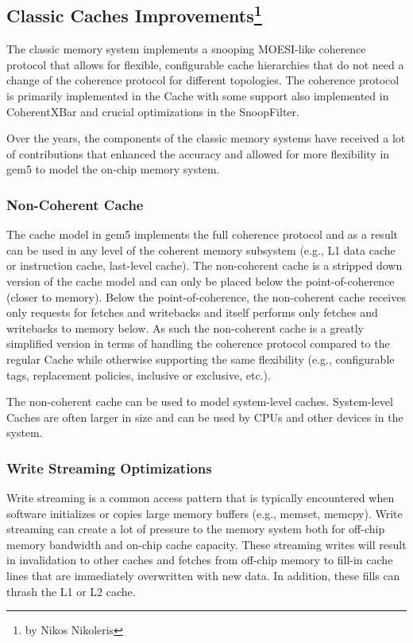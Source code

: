 \subsection[Classic Caches Improvements]{Classic Caches Improvements\footnote{by Nikos Nikoleris}}

The classic memory system implements a snooping MOESI-like coherence protocol that allows for flexible, configurable cache hierarchies that do not need a change of the coherence protocol for different topologies.
The coherence protocol is primarily implemented in the Cache with some support also implemented in CoherentXBar and crucial optimizations in the SnoopFilter.

Over the years, the components of the classic memory systems have received a lot of contributions that enhanced the accuracy and allowed for more flexibility in gem5 to model the on-chip memory system.

\subsubsection[Non-Coherent Cache]{Non-Coherent Cache}
The cache model in gem5 implements the full coherence protocol and as a result can be used in any level of the coherent memory subsystem (e.g., L1 data cache or instruction cache, last-level cache).
The non-coherent cache is a stripped down version of the cache model and can only be placed below the point-of-coherence (closer to memory).
Below the point-of-coherence, the non-coherent cache receives only requests for fetches and writebacks and itself performs only fetches and writebacks to memory below.
As such the non-coherent cache is a greatly simplified version in terms of handling the coherence protocol compared to the regular Cache while otherwise supporting the same flexibility (e.g., configurable tags, replacement policies, inclusive or exclusive, etc.).

The non-coherent cache can be used to model system-level caches.
System-level Caches are often larger in size and can be used by CPUs and other devices in the system.

\subsubsection[Write Streaming Optimizations]{Write Streaming Optimizations}

Write streaming is a common access pattern that is typically encountered when software initializes or copies large memory buffers (e.g., memset, memcpy).
Write streaming can create a lot of pressure to the memory system both for off-chip memory bandwidth and on-chip cache capacity.
These streaming writes will result in invalidation to other caches and fetches from off-chip memory to fill-in cache lines that are immediately overwritten with new data.
In addition, these fills can thrash the L1 or L2 cache.

